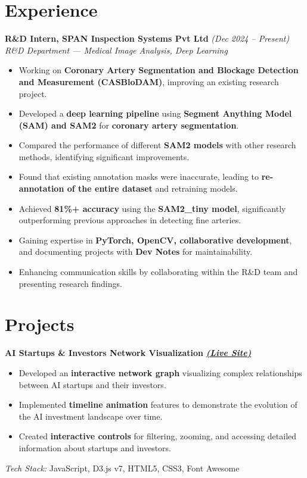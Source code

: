 \documentclass[10pt, letterpaper]{article}
\begin{document}
\section{Experience}

\textbf{R\&D Intern, SPAN Inspection Systems Pvt Ltd} \hfill \textit{(Dec 2024 – Present)} \\
\textit{R\&D Department — Medical Image Analysis, Deep Learning}  
\begin{itemize}
    \item Working on \textbf{Coronary Artery Segmentation and Blockage Detection and Measurement (CASBloDAM)}, improving an existing research project.  
    \item Developed a \textbf{deep learning pipeline} using \textbf{Segment Anything Model (SAM) and SAM2} for \textbf{coronary artery segmentation}.  
    \item Compared the performance of different \textbf{SAM2 models} with other research methods, identifying significant improvements.  
    \item Found that existing annotation masks were inaccurate, leading to \textbf{re-annotation of the entire dataset} and retraining models.  
    \item Achieved \textbf{81\%+ accuracy} using the \textbf{SAM2\_tiny model}, significantly outperforming previous approaches in detecting fine arteries.  
    \item Gaining expertise in \textbf{PyTorch, OpenCV, collaborative development}, and documenting projects with \textbf{Dev Notes} for maintainability.  
    \item Enhancing communication skills by collaborating within the R\&D team and presenting research findings.  
\end{itemize}

\section{Projects}

\textbf{AI Startups \& Investors Network Visualization} 
\hfill \href{https://astroanand-6e.github.io/A_web_of_AI_startups_and_investors/}{\textbf{\textit{(Live Site)}}} \\
\begin{itemize}
    \item Developed an \textbf{interactive network graph} visualizing complex relationships between AI startups and their investors.
    \item Implemented \textbf{timeline animation} features to demonstrate the evolution of the AI investment landscape over time.
    \item Created \textbf{interactive controls} for filtering, zooming, and accessing detailed information about startups and investors.
\end{itemize}
\textit{Tech Stack:} JavaScript, D3.js v7, HTML5, CSS3, Font Awesome
\end{document}
